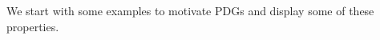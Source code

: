 \documentclass{article}
\theoremstyle{plain}
\theoremstyle{definition}
\theoremstyle{remark}
\numberwithin{equation}{section}
\begin{document}
	We start with some examples to motivate PDGs and display some
        of these properties.  
\end{document}
